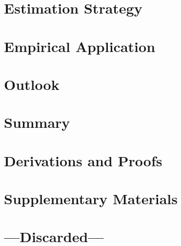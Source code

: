 \documentclass[a4paper,12pt,pagesize,DIV=calc,smallheadings,english]{article}
\begin{document}
\newpage
\section{Estimation Strategy}
\label{sec:algo}

\newpage
\section{Empirical Application}
\label{sec:app}

\newpage
\section{Outlook}
\label{sec:outl}

\newpage
\section{Summary}
\label{sec:sum}

\newpage
\nocite{*}
\printbibliography[heading=bibintoc] %



\newpage
\appendix
{}
\section{Derivations and Proofs}
\label{app:deriv}


\newpage
\section{Supplementary Materials}
\label{app:deriv}


\newpage
\section{---Discarded---}

\end{document}

